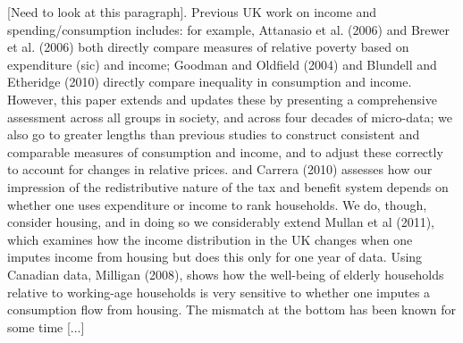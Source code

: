 [Need to look at this paragraph]. Previous UK work on income and spending/consumption includes: for example, Attanasio et al. (2006) and Brewer et al. (2006) both directly compare measures of relative poverty based on expenditure (sic) and income; Goodman and Oldfield (2004) and Blundell and Etheridge (2010) directly compare inequality in consumption and income. However, this paper extends and updates these by presenting a comprehensive assessment across all groups in society, and across four decades of micro-data; we also go to greater lengths than previous studies to construct consistent and comparable measures of consumption and income, and to adjust these correctly to account for changes in relative prices. and Carrera (2010) assesses how our impression of the redistributive nature of the tax and benefit system depends on whether one uses expenditure or income to rank households. We do, though, consider housing, and in doing so we considerably extend Mullan et al (2011), which examines how the income distribution in the UK changes when one imputes income from housing but does this only for one year of data. Using Canadian data, Milligan (2008), shows how the well-being of elderly households relative to working-age households is very sensitive to whether one imputes a consumption flow from housing. The mismatch at the bottom has been known for some time [...]





